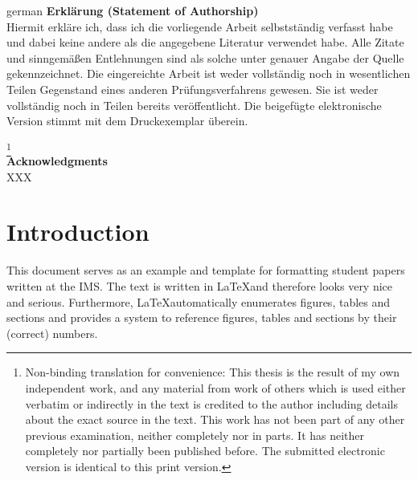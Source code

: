\documentclass[12pt,leqno,a4paper]{article}
\begin{document}
\begin{otherlanguage}
{german}
\noindent\textbf{Erklärung (Statement of Authorship)}\\


\noindent Hiermit erkläre ich, dass ich die vorliegende Arbeit selbstständig verfasst habe und dabei keine andere als die angegebene Literatur verwendet habe. Alle Zitate und sinngemäßen Entlehnungen sind als solche unter genauer Angabe der Quelle gekennzeichnet. Die eingereichte Arbeit ist weder vollständig noch in wesentlichen Teilen Gegenstand eines anderen Prüfungsverfahrens gewesen. Sie ist weder vollständig noch in Teilen bereits veröffentlicht. Die beigefügte elektronische Version stimmt mit dem Druckexemplar überein.%
\end{otherlanguage}
\footnote{Non-binding translation for convenience: This thesis is the result of my own independent work, and any material from work of others which is used either verbatim or indirectly in the text is credited to the author including details about the exact source in the text. This work has not been part of any other previous examination, neither completely nor in parts. It has neither completely nor partially been published before. The submitted electronic version is identical to this print version.}\\[2cm]

\newpage
\thispagestyle{empty}
\noindent \textbf{Acknowledgments}\\

\noindent XXX


\newpage
\tableofcontents
\newpage

\section{Introduction}
This document serves as an example and template for formatting student papers written at the IMS. The text is written in \LaTeX and therefore looks very nice and serious. Furthermore, \LaTeX automatically enumerates figures, tables and sections and provides a system to reference figures, tables and sections by their (correct) numbers. 
\end{document}
